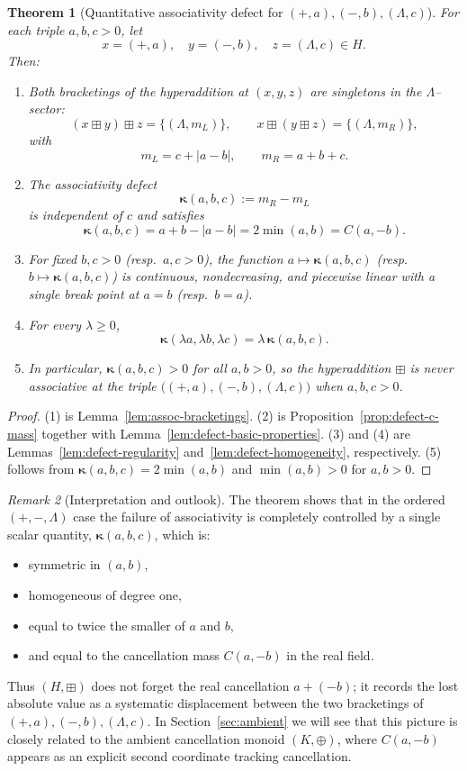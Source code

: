 \documentclass[11pt]{amsart}
\numberwithin{equation}{section}
\newtheorem{theorem}{Theorem}[section]
\theoremstyle{definition}
\theoremstyle{remark}
\newtheorem{remark}[theorem]{Remark}
\newcommand{\Hnum}{H}                      %
\newcommand{\AssocCurv}{\boldsymbol{\kappa}} %
\newcommand{\Kamb}{K}                      %
\newcommand{\op}{\boxplus}                 %
\newcommand{\Cfun}{C}                      %
\begin{document}
\begin{theorem}[Quantitative associativity defect for $(+,a),(-,b),(\Lambda,c)$]
\label{thm:defect-summary}
For each triple $a,b,c>0$, let
\[
  x=(+,a),\quad y=(-,b),\quad z=(\Lambda,c)\in\Hnum.
\]
Then:
\begin{enumerate}
  \item Both bracketings of the hyperaddition at $(x,y,z)$ are
        singletons in the $\Lambda$–sector:
  \[
    (x\op y)\op z = \{(\Lambda,m_L)\},\qquad
    x\op(y\op z) = \{(\Lambda,m_R)\},
  \]
  with
  \[
    m_L = c+|a-b|,\qquad
    m_R = a+b+c.
  \]
  \item The associativity defect
  \[
    \AssocCurv(a,b,c) := m_R-m_L
  \]
  is independent of $c$ and satisfies
  \[
    \AssocCurv(a,b,c) = a+b-|a-b| = 2\min(a,b) = \Cfun(a,-b).
  \]
  \item For fixed $b,c>0$ (resp.\ $a,c>0$), the function
        $a\mapsto\AssocCurv(a,b,c)$ (resp.\ $b\mapsto\AssocCurv(a,b,c)$) is
        continuous, nondecreasing, and piecewise linear with a single
        break point at $a=b$ (resp.\ $b=a$).
  \item For every $\lambda\ge0$,
  \[
    \AssocCurv(\lambda a,\lambda b,\lambda c)
    = \lambda\,\AssocCurv(a,b,c).
  \]
  \item In particular, $\AssocCurv(a,b,c)>0$ for all $a,b>0$, so the
        hyperaddition $\op$ is never associative at the triple
        $\bigl((+,a),(-,b),(\Lambda,c)\bigr)$ when $a,b,c>0$.
\end{enumerate}
\end{theorem}

\begin{proof}
(1) is Lemma~\ref{lem:assoc-bracketings}.  (2) is
Proposition~\ref{prop:defect-c-mass} together with
Lemma~\ref{lem:defect-basic-properties}.  (3) and (4) are
Lemmas~\ref{lem:defect-regularity} and~\ref{lem:defect-homogeneity},
respectively.  (5) follows from $\AssocCurv(a,b,c)=2\min(a,b)$ and $\min(a,b)>0$ for
$a,b>0$.
\end{proof}

\begin{remark}[Interpretation and outlook]
\label{rem:defect-outlook}
The theorem shows that in the ordered $(+,-,\Lambda)$ case the failure
of associativity is completely controlled by a single scalar quantity,
$\AssocCurv(a,b,c)$, which is:
\begin{itemize}[leftmargin=2em]
  \item symmetric in $(a,b)$,
  \item homogeneous of degree one,
  \item equal to twice the smaller of $a$ and $b$,
  \item and equal to the cancellation mass $\Cfun(a,-b)$ in the real
        field.
\end{itemize}
Thus $(\Hnum,\op)$ does not forget the real cancellation $a+(-b)$; it
records the lost absolute value as a systematic displacement between
the two bracketings of $(+,a),(-,b),(\Lambda,c)$.  In
Section~\ref{sec:ambient} we will see that this picture is closely
related to the ambient cancellation monoid $(\Kamb,\oplus)$, where
$\Cfun(a,-b)$ appears as an explicit second coordinate tracking
cancellation.
\end{remark}
\end{document}
